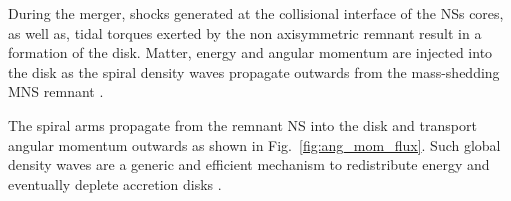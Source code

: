 During the merger, shocks generated at the collisional interface of the \acp{NS} cores,
as well as, tidal torques exerted by the non axisymmetric remnant result in a formation
of the disk. 
Matter, energy and angular momentum are injected into the disk as the spiral density waves 
propagate outwards from the mass-shedding \ac{MNS} remnant 
\citep{Bernuzzi:2015opx,Radice:2018xqa}.

The spiral arms propagate from the remnant \ac{NS} into
the disk and transport angular momentum outwards as shown in
Fig.~\ref{fig:ang_mom_flux}. Such global density waves are a generic and
efficient mechanism to redistribute energy and eventually deplete  
accretion disks \citep{Goodman:2001a,Rafikov:2016a,Arzamasskiy:2018a}. 

